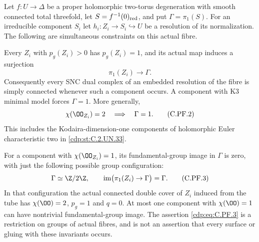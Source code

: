 \begin{proposition}\label{cdp:st:C.2.UN.47}

Let $f:U\to\Delta$ be a proper holomorphic two-torus degeneration
with smooth connected total threefold, let $S=f^{-1}(0)_{\rm red}$,
and put $\Gamma=\pi_1(S)$. For an irreducible component $S_i$ let
$h_i:Z_i\to S_i\hookrightarrow U$ be a resolution of its normalization.
The following are simultaneous constraints on this actual fibre.

Every $Z_i$ with $p_g(Z_i)>0$ has $p_g(Z_i)=1$, and its actual
map induces a surjection
\[
                         \pi_1(Z_i)\longrightarrow\Gamma .
                                                        \tag{C.PF.1}\label{cdp:eq:C.PF.1}
\]
Consequently every SNC dual complex of an embedded resolution of
the fibre is simply connected whenever such a component occurs.
A component with K3 minimal model forces $\Gamma=1$.
More generally,
\[
                    \chi(\OO_{Z_i})=2
                         \quad\Longrightarrow\quad\Gamma=1 .
                                                        \tag{C.PF.2}\label{cdp:eq:C.PF.2}
\]
This includes the Kodaira-dimension-one components of holomorphic
Euler characteristic two in \ref{cdp:st:C.2.UN.33}.

For a component with $\chi(\OO_{Z_i})=1$, its fundamental-group
image in $\Gamma$ is zero, with just the following possible
group configuration:
\[
 \Gamma\simeq\Z/2\Z,\qquad
 \operatorname{im}\bigl(\pi_1(Z_i)\to\Gamma\bigr)=\Gamma .
                                                        \tag{C.PF.3}\label{cdp:eq:C.PF.3}
\]
In that configuration the actual connected double cover of $Z_i$
induced from the tube has
$\chi(\OO)=2$, $p_g=1$ and $q=0$. At most one component with
$\chi(\OO)=1$ can have nontrivial fundamental-group image.
The assertion \eqref{cdp:eq:C.PF.3} is a restriction on groups of actual fibres,
and is not an assertion that every surface or gluing with these
invariants occurs.
\end{proposition}

